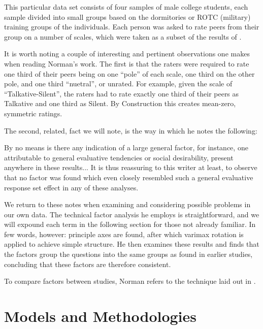 \documentclass[a4paper,12pt]{article}
\begin{document}
This particular data set consists of four samples of male college students, each sample divided into small groups based on the dormitories or ROTC (military) training groups of the individuals. Each person was asked to rate peers from their group on a number of scales, which were taken as a subset of the results of \cite{tupes1958}.

It is worth noting a couple of interesting and pertinent observations one makes when reading Norman's work. The first is that the raters were required to rate one third of their peers being on one ``pole'' of each scale, one third on the other pole, and one third ``nuetral'', or unrated. For example, given the scale of ``Talkative-Silent'', the raters had to rate exactly one third of their peers as Talkative and one third as Silent. By Construction this creates mean-zero, symmetric ratings.

The second, related, fact we will note, is the way in which he notes the following:

\begin{displayquote}
By no means is there any indication of a large general factor, for instance, one attributable to general evaluative tendencies or social desirability, present anywhere in these results... It is thus reassuring to this writer at least, to observe that no factor was found which even closely resembled such a general evaluative response set effect in any of these analyses.
\end{displayquote}

We return to these notes when examining and considering possible problems in our own data. The technical factor analysis he employs is straightforward, and we will expound each term in the following section for those not already familiar. In few words, however: principle axes are found, after which varimax rotation is applied to achieve simple structure. He then examines these results and finds that the factors group the questions into the same groups as found in earlier studies, concluding that these factors are therefore consistent.

To compare factors between studies, Norman refers to the technique laid out in \cite{kaiser1971}.

\section{Models and Methodologies}

\newcommand{\X}{$\mathbf{X} \ $}
\newcommand{\F}{$\mathbf{F} \ $}
\newcommand{\Load}{$\mathbf{L} \ $}
\newcommand{\B}{\mathbf}
\end{document}
